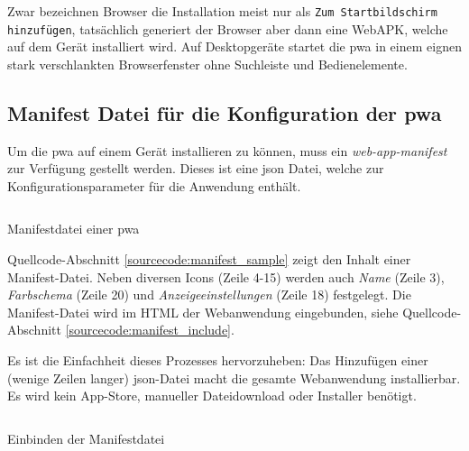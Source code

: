 Zwar bezeichnen Browser die Installation meist nur als \texttt{Zum Startbildschirm hinzufügen}, tatsächlich generiert der Browser aber dann eine WebAPK, welche auf dem Gerät installiert wird. Auf Desktopgeräte startet die \ac{pwa} in einem eignen stark verschlankten Browserfenster ohne Suchleiste und Bedienelemente. \cite{GooglePWAInstallation}


\subsection{Manifest Datei für die Konfiguration der \ac{pwa}}

Um die \ac{pwa} auf einem Gerät installieren zu können, muss ein \textit{web-app-manifest} zur Verfügung gestellt werden. Dieses ist eine \ac{json} Datei, welche zur Konfigurationsparameter für die Anwendung enthält. \cite{GooglePWAManifest}

\begin{listing}[h!]
    \inputminted{json}{sourcecode/manifest_sample.json}
    \caption{Manifestdatei einer \ac{pwa}}
      \label{sourcecode:manifest_sample}
\end{listing}

Quellcode-Abschnitt \ref{sourcecode:manifest_sample} zeigt den Inhalt einer Manifest-Datei. Neben diversen Icons (Zeile 4-15) werden auch \textit{Name} (Zeile 3), \textit{Farbschema} (Zeile 20) und \textit{Anzeigeeinstellungen} (Zeile 18) festgelegt.
Die Manifest-Datei wird im HTML der Webanwendung eingebunden, siehe Quellcode-Abschnitt \ref{sourcecode:manifest_include}. 

Es ist die Einfachheit dieses Prozesses hervorzuheben: Das Hinzufügen einer (wenige Zeilen langer) \ac{json}-Datei macht die gesamte Webanwendung installierbar. Es wird kein App-Store, manueller Dateidownload oder Installer benötigt. 

\begin{listing}[H]
    \inputminted{xml}{sourcecode/include_manifest.html}
    \caption{Einbinden der Manifestdatei}
      \label{sourcecode:manifest_include}
\end{listing}



